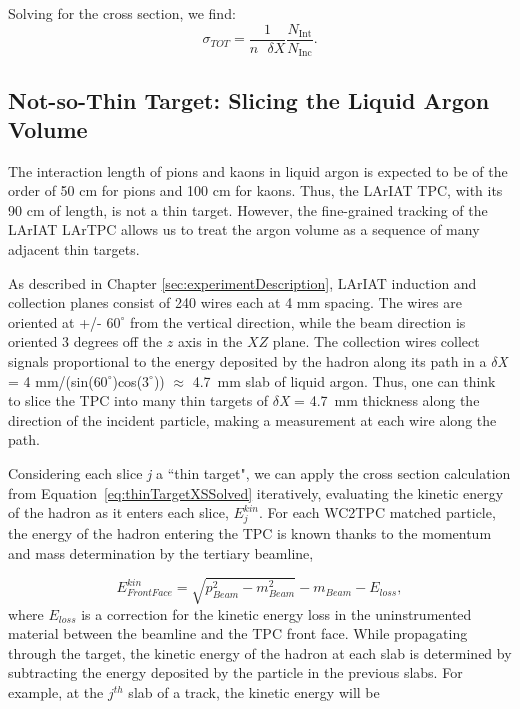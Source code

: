 Solving for the cross section, we find:
\begin{equation}
 \sigma_{TOT}  = \frac{1}{n \text{ }\delta X}\frac{N_{\text{Int}}}{N_{\text{Inc}}}.
\label{eq:thinTargetXSSolved}
\end{equation}

\subsection{Not-so-Thin Target: Slicing the Liquid Argon Volume}\label{ch:XSRaw}
The interaction length of pions and kaons in liquid argon is expected to be of the order of 50 cm for pions and 100 cm for kaons. Thus, the LArIAT TPC, with its 90 cm of length, is not a thin target. However, the fine-grained tracking of the LArIAT LArTPC allows us to treat the argon volume as a sequence of many adjacent thin targets. 

As described in Chapter \ref{sec:experimentDescription}, LArIAT induction and collection planes consist of 240 wires each at 4 mm spacing. The wires are oriented at +/- $60^{\circ}$ from the vertical direction, while the beam direction is oriented 3 degrees off the $z$ axis in the $XZ$ plane.  The collection wires collect signals proportional to the energy deposited by the hadron along its path in a  $\delta${\emph{X}} = 4 mm/(sin($60^{\circ}$)cos($3^{\circ}$)) $\approx$ 4.7~mm slab of liquid argon. Thus, one can think to slice the TPC into many thin targets of $\delta${\emph{X}} = 4.7~mm thickness along the direction of the incident particle, making a measurement at each wire along the path.

Considering each slice {\emph{j}}  a ``thin target",  we can apply the cross section calculation from Equation~\ref{eq:thinTargetXSSolved} iteratively, evaluating the kinetic energy of the hadron as it enters each slice, $E_{j}^{kin}$.  For each WC2TPC matched particle, the energy of the hadron entering the TPC is known thanks to the momentum and mass determination by the tertiary beamline, 

\begin{equation}
 E^{kin}_{Front Face}  = \sqrt{p^2_{Beam} - m^2_{Beam}} - m_{Beam} - E_{loss},
\label{eq:enFF}
\end{equation}
where $E_{loss}$ is a correction for the kinetic energy loss in the uninstrumented material between the beamline and the TPC front face. While propagating through the target,  the kinetic energy of the hadron at each slab is determined by subtracting the energy deposited by the particle in the previous slabs. For example, at the $j^{th}$ slab of a track, the kinetic energy will be

